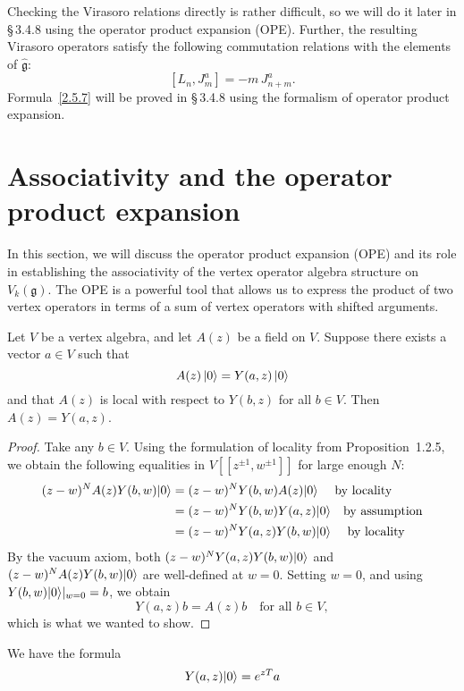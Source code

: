 \documentclass[12pt]{article}
\begin{document}
Checking the Virasoro relations directly is rather difficult, so we will
do it later in \S\,3.4.8 using the operator product expansion (OPE).
Further, the resulting Virasoro operators satisfy the following
commutation relations with the elements of $\widehat{\mathfrak{g}}$:
\begin{equation}\label{2.5.7}
[L_n, J^a_m] = -m\,J^a_{n+m}.
\end{equation}
Formula~\eqref{2.5.7} will be proved in \S\,3.4.8 using the formalism of operator product expansion.

\section{Associativity and the operator product expansion}

In this section, we will discuss the operator product expansion (OPE) and its role in establishing the associativity of the vertex operator algebra structure on $V_k(\mathfrak{g})$. The OPE is a powerful tool that allows us to express the product of two vertex operators in terms of a sum of vertex operators with shifted arguments.

\begin{theorem}
Let $V$ be a vertex algebra, and let $A(z)$ be a field on $V$. 
Suppose there exists a vector $a \in V$ such that
\[
A(z)\,\lvert 0 \rangle = Y(a,z)\,\lvert 0 \rangle
\]
and that $A(z)$ is local with respect to $Y(b,z)$ for all $b \in V$.
Then $A(z) = Y(a,z)$.
\end{theorem}

\begin{proof}
Take any $b \in V$. 
Using the formulation of locality from Proposition~1.2.5, 
we obtain the following equalities in $V[[z^{\pm1}, w^{\pm1}]]$ for large enough $N$:
\begin{align*}
(z-w)^N A(z)Y(b,w)\ket{0} &= (z-w)^N Y(b,w)A(z)\ket{0} \texty{ by locality}\\
&= (z-w)^N Y(b,w)Y(a,z)\ket{0} \texty{by assumption}\\
&= (z-w)^N Y(a,z)Y(b,w)\ket{0} \texty{ by locality}
\end{align*}
By the vacuum axiom, both $(z-w)^N Y(a,z)Y(b,w)\lvert 0 \rangle$ and $(z-w)^N A(z)Y(b,w)\lvert 0 \rangle$
are well-defined at $w=0$. 
Setting $w=0$, and using $Y(b,w)\lvert 0 \rangle|_{w=0} = b$, we obtain
\[
Y(a,z)b = A(z)b \quad \text{for all } b \in V,
\]
which is what we wanted to show.
\end{proof}
\begin{lemma}
    We have the formula \begin{align*}
        Y(a,z)\lvert 0 \rangle = e^{zT}a
    \end{align*}
\end{lemma}
\end{document}
